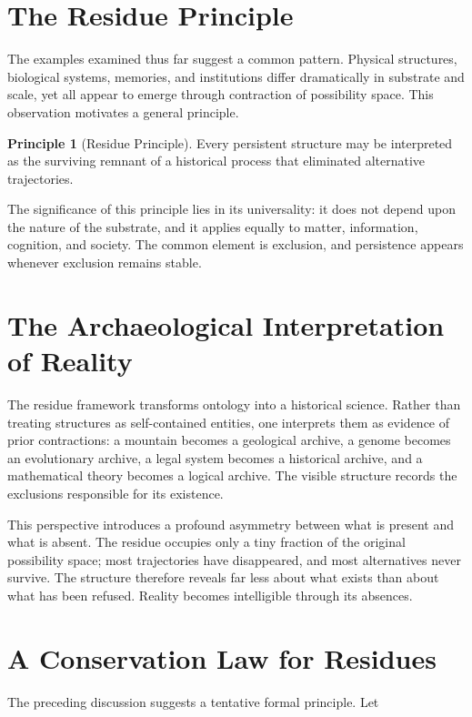 \documentclass[11pt,oneside]{book}
\theoremstyle{plain}
\theoremstyle{definition}
\newtheorem{principle}[theorem]{Principle}
\theoremstyle{remark}
\begin{document}
\section{The Residue Principle}

The examples examined thus far suggest a common pattern. Physical structures, biological systems, memories, and institutions differ dramatically in substrate and scale, yet all appear to emerge through contraction of possibility space. This observation motivates a general principle.

\begin{principle}[Residue Principle]
Every persistent structure may be interpreted as the surviving remnant of a historical process that eliminated alternative trajectories.
\end{principle}

The significance of this principle lies in its universality: it does not depend upon the nature of the substrate, and it applies equally to matter, information, cognition, and society. The common element is exclusion, and persistence appears whenever exclusion remains stable.

\section{The Archaeological Interpretation of Reality}

The residue framework transforms ontology into a historical science. Rather than treating structures as self-contained entities, one interprets them as evidence of prior contractions: a mountain becomes a geological archive, a genome becomes an evolutionary archive, a legal system becomes a historical archive, and a mathematical theory becomes a logical archive. The visible structure records the exclusions responsible for its existence.

This perspective introduces a profound asymmetry between what is present and what is absent. The residue occupies only a tiny fraction of the original possibility space; most trajectories have disappeared, and most alternatives never survive. The structure therefore reveals far less about what exists than about what has been refused. Reality becomes intelligible through its absences.

\section{A Conservation Law for Residues}

The preceding discussion suggests a tentative formal principle. Let
\end{document}
